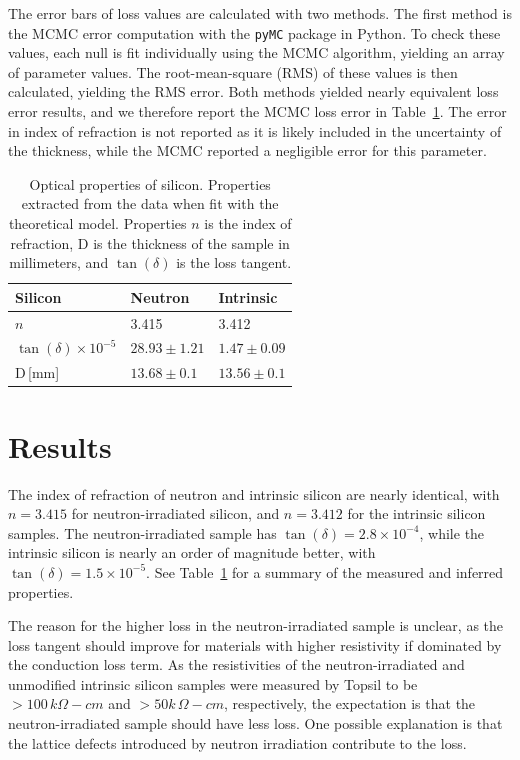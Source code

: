 The error bars of loss values are calculated with two methods. The first method is the MCMC error computation with the \verb|pyMC| package in Python. To check these values, each null is fit individually using the MCMC algorithm, yielding an array of parameter values. The root-mean-square (RMS) of these values is then calculated, yielding the RMS error. Both methods yielded nearly equivalent loss error results, and we therefore report the MCMC loss error in Table~\ref{tab:silicon}. The error in index of refraction is not reported as it is likely included in the uncertainty of the thickness, while the MCMC reported a negligible error for this parameter.

\begin{table}
    \centering
\begin{tabular}{ |p{3cm}|p{3cm}|p{3cm}| }
 \hline
 Silicon & Neutron & Intrinsic\\ \hline
 \hline
  $n$ & 3.415 & 3.412 \\
 \hline
 $\tan(\delta)\times 10^{-5}$ & $28.93 \pm 1.21$ & $1.47 \pm 0.09$\\
 \hline
  D\,[mm] & $13.68 \pm 0.1 $ & $13.56 \pm 0.1$\\
 \hline
\end{tabular}
    \caption{Optical properties of silicon. Properties extracted from the data when fit with the theoretical model. Properties $n$ is the index of refraction, D is the thickness of the sample in millimeters, and $\tan(\delta)$ is the loss tangent.}
    \label{tab:silicon}
\end{table}

\section{Results}
\label{sec:si_results}
The index of refraction of neutron and intrinsic silicon are nearly identical, with $n =3.415$ for neutron-irradiated silicon, and $n =3.412$ for the intrinsic silicon samples. The neutron-irradiated sample has $\tan(\delta) = 2.8\times10^{-4}$, while the intrinsic silicon is nearly an order of magnitude better, with $\tan(\delta)= 1.5 \times 10^{-5}$. See Table~\ref{tab:silicon} for a summary of the measured and inferred properties.

The reason for the higher loss in the neutron-irradiated sample is unclear, as the loss tangent should improve for materials with higher resistivity if dominated by the conduction loss term. As the resistivities of the neutron-irradiated and unmodified intrinsic silicon samples were measured by Topsil to be $>100\,k\Omega-cm$ and $>50k\,\Omega-cm$, respectively, the expectation is that the neutron-irradiated sample should have less loss. One possible explanation is that the lattice defects introduced by neutron irradiation contribute to the loss.

